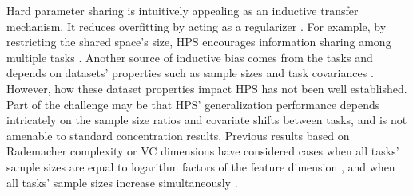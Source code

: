 Hard parameter sharing is intuitively appealing as an inductive transfer mechanism.
It reduces overfitting by acting as a regularizer \cite{R17}.
For example, by restricting the shared space's size, HPS encourages information sharing among multiple tasks \cite{KD12}.
Another source of inductive bias comes from the tasks and depends on datasets' properties such as sample sizes and task covariances \cite{WZR20}.
However, how these dataset properties impact HPS has not been well established.
Part of the challenge may be that HPS' generalization performance depends intricately on the sample size ratios and covariate shifts between tasks, and is not amenable to standard concentration results.
Previous results based on Rademacher complexity or VC dimensions have considered cases when all tasks' sample sizes are equal to logarithm factors of the feature dimension \cite{B00,MPR16}, and when all tasks' sample sizes increase simultaneously \cite{AZ05,M06}.

